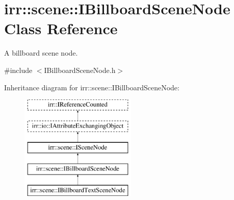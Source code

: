 \hypertarget{classirr_1_1scene_1_1IBillboardSceneNode}{}\section{irr\+:\+:scene\+:\+:I\+Billboard\+Scene\+Node Class Reference}
\label{classirr_1_1scene_1_1IBillboardSceneNode}


A billboard scene node.  




{\ttfamily \#include $<$I\+Billboard\+Scene\+Node.\+h$>$}

Inheritance diagram for irr\+:\+:scene\+:\+:I\+Billboard\+Scene\+Node\+:\begin{figure}[H]
\begin{center}
\leavevmode
\includegraphics[height=5.000000cm]{classirr_1_1scene_1_1IBillboardSceneNode}
\end{center}
\end{figure}
